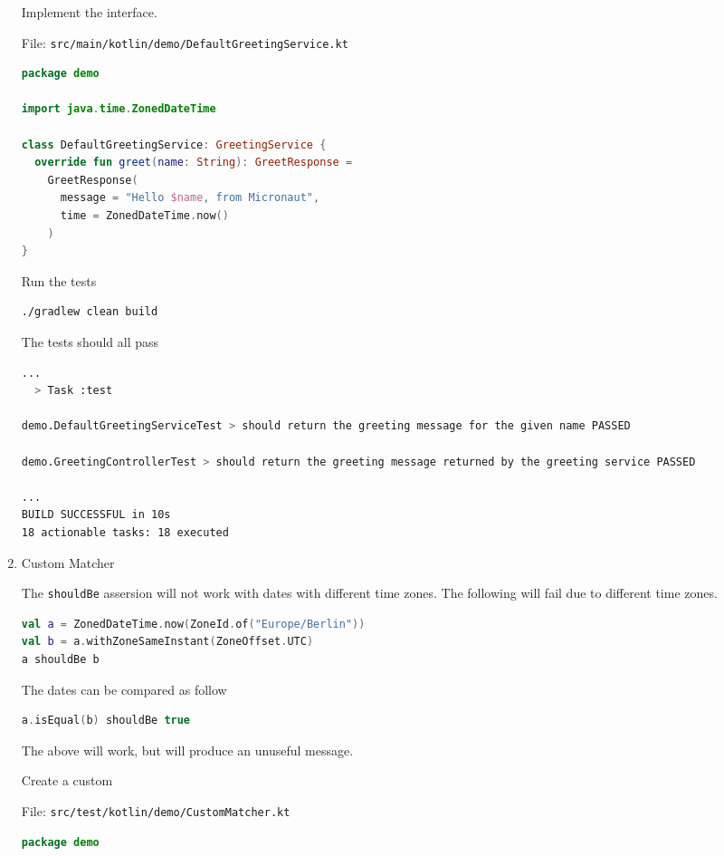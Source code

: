 \begin{enumerate}
Implement the interface.

File: \texttt{src/main/kotlin/demo/DefaultGreetingService.kt}
\begin{lstlisting}[language=Kotlin]
package demo

import java.time.ZonedDateTime

class DefaultGreetingService: GreetingService {
  override fun greet(name: String): GreetResponse =
    GreetResponse(
      message = "Hello $name, from Micronaut",
      time = ZonedDateTime.now()
    )
}
\end{lstlisting}

Run the tests

\begin{lstlisting}[language=bash]
./gradlew clean build
\end{lstlisting}

The tests should all pass

\begin{lstlisting}[language=bash]
...
  > Task :test

demo.DefaultGreetingServiceTest > should return the greeting message for the given name PASSED

demo.GreetingControllerTest > should return the greeting message returned by the greeting service PASSED

...
BUILD SUCCESSFUL in 10s
18 actionable tasks: 18 executed
\end{lstlisting}

\item Custom Matcher

The \texttt{shouldBe} assersion will not work with dates with different time zones.  The following will fail due to different time zones.

\begin{lstlisting}[language=Kotlin]
val a = ZonedDateTime.now(ZoneId.of("Europe/Berlin"))
val b = a.withZoneSameInstant(ZoneOffset.UTC)
a shouldBe b
\end{lstlisting}

The dates can be compared as follow

\begin{lstlisting}[language=Kotlin]
a.isEqual(b) shouldBe true
\end{lstlisting}

The above will work, but will produce an unuseful message.

Create a custom

File: \texttt{src/test/kotlin/demo/CustomMatcher.kt}
\begin{lstlisting}[language=Kotlin]
package demo


\end{lstlisting}
\end{enumerate}

